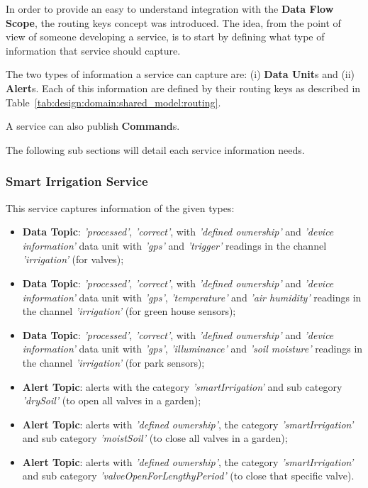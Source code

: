 In order to provide an easy to understand integration with the \textbf{Data Flow Scope}, the routing keys concept was introduced. The idea, from the point of view of someone developing a service, is to start by defining what type of information that service should capture.

The two types of information a service can capture are: (i) \textbf{Data Unit}s and (ii) \textbf{Alert}s. Each of this information are defined by their routing keys as described in Table~\ref{tab:design:domain:shared_model:routing}.

A service can also publish \textbf{Command}s.

The following sub sections will detail each service information needs.

\subsubsection*{Smart Irrigation Service}
\label{subsubsec:implementation:description:services:irrigation}

This service captures information of the given types:

\begin{itemize}
    \item \textbf{Data Topic}: \textit{'processed'}, \textit{'correct'}, with \textit{'defined ownership'} and \textit{'device information'} data unit with \textit{'gps'} and \textit{'trigger'} readings in the channel \textit{'irrigation'} (for valves);
    \item \textbf{Data Topic}: \textit{'processed'}, \textit{'correct'}, with \textit{'defined ownership'} and \textit{'device information'} data unit with \textit{'gps'}, \textit{'temperature'} and \textit{'air humidity'} readings in the channel \textit{'irrigation'} (for green house sensors);
    \item \textbf{Data Topic}: \textit{'processed'}, \textit{'correct'}, with \textit{'defined ownership'} and \textit{'device information'} data unit with \textit{'gps'}, \textit{'illuminance'} and \textit{'soil moisture'} readings in the channel \textit{'irrigation'} (for park sensors);
    \item \textbf{Alert Topic}: alerts with the category \textit{'smartIrrigation'} and sub category \textit{'drySoil'} (to open all valves in a garden);
    \item \textbf{Alert Topic}: alerts with \textit{'defined ownership'}, the category \textit{'smartIrrigation'} and sub category \textit{'moistSoil'} (to close all valves in a garden);
    \item \textbf{Alert Topic}: alerts with \textit{'defined ownership'}, the category \textit{'smartIrrigation'} and sub category \textit{'valveOpenForLengthyPeriod'} (to close that specific valve).
\end{itemize}

